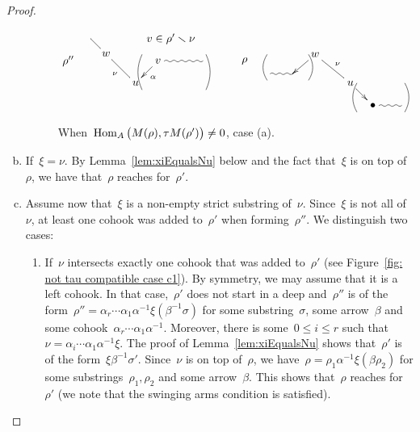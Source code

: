 \documentclass{amsart}
\theoremstyle{definition}
\newcommand{\ssm}{\smallsetminus} %
\newcommand{\Hom}[1]{\operatorname{{\rm Hom}}_{#1}}
\begin{document}
\begin{proof}
\begin{enumerate}[(a)]
\begin{figure}[h]
 	\capstart
\[
\xy
%
(0,0)*+{\rho''};
(7,7)="1";
(11.8,2.2)*+{w}="2";
(21,-7)*+{u}="3";
(28,0)*+{v}="4";
(42,0)="6";
%
{\ar@{-} "1";"2"};
{\ar@{-}_{\nu} "2";"3"};
{\ar^{\alpha} "4";"3"};
{\ar@{~} "4";"6"};
%
{\ar@/^.3pc/@{-} (23,-9);(23,2)};
{\ar@/_.3pc/@{-} (43,-9);(43,2)};
%
(32,7)*+{v\in \rho'\ssm\nu};
%
%
%
(55,0)*+{\rho};
(63,-4)="11";
(70,-4)="12";
(77,2)*+{w}="13";
(88,-7)*+{u}="14";
(95,-14)*+{\bullet}="15";
(104,-14)="16";
%
{\ar@{~} "11";"12"};
{\ar "13";"12"};
{\ar@{-}^{\nu} "13";"14"};
{\ar "14";"15"};
{\ar@{~} "15";"16"};
%
{\ar@/^.3pc/@{-} (62,-6);(62,2)};
{\ar@/_.3pc/@{-} (75,-6);(75,2)};
%
{\ar@/_.3pc/@{-} (90,-7);(90,-16)};
{\ar@/^.3pc/@{-} (105,-7);(105,-16)};
%
\endxy
\]
    \caption{When~$\Hom{A} \big( M(\rho), \tau M(\rho') \big) \ne 0$, case (a).}
    \label{fig:not tau compatible case a}
\end{figure}

\item If~$\xi=\nu$. By Lemma~\ref{lem:xiEqualsNu} below and the fact that~$\xi$ is on top of~$\rho$, we have that~$\rho$ reaches for~$\rho'$. 

\item Assume now that~$\xi$ is a non-empty strict substring of~$\nu$. Since~$\xi$ is not all of~$\nu$, at least one cohook was added to~$\rho'$ when forming~$\rho''$. We distinguish two cases:

\begin{enumerate}[(c1)]
\item If~$\nu$ intersects exactly one cohook that was added to~$\rho'$ (see Figure~\ref{fig: not tau compatible case c1}).
By symmetry, we may assume that it is a left cohook.
In that case,~$\rho'$ does not start in a deep and~$\rho''$ is of the form~$\rho''=\alpha_r\cdots\alpha_1\alpha^{-1}\xi(\beta^{-1}\sigma)$ for some substring~$\sigma$, some arrow~$\beta$ and some cohook~$\alpha_r\cdots\alpha_1\alpha^{-1}$.
Moreover, there is some~$0\leq i\leq r$ such that~$\nu=\alpha_i\cdots\alpha_1\alpha^{-1}\xi$.
The proof of Lemma~\ref{lem:xiEqualsNu} shows that~$\rho'$ is of the form~$\xi\beta^{-1}\sigma'$.
Since~$\nu$ is on top of~$\rho$, we have~$\rho=\rho_1\alpha^{-1}\xi(\beta\rho_2)$ for some substrings~$\rho_1,\rho_2$ and some arrow~$\beta$.
This shows that~$\rho$ reaches for~$\rho'$ (we note that the swinging arms condition is satisfied).


\end{enumerate}
\end{enumerate}
\end{proof}
\end{document}
